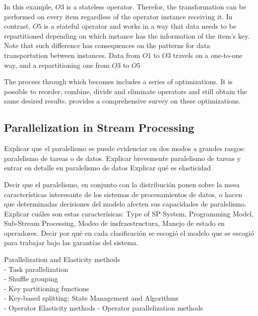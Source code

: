 
  In this example, $O3$ is a stateless operator. Therefor, the transformation can be performed on every item regardless of the operator instance receiving it. In contrast, $O5$ is a stateful operator and works in a way that data needs to be repartitioned depending on which instance has the information of the item's key. Note that such difference has consequences on the patterns for data transportation between instances. Data from $O1$ to $O3$ travels on a one-to-one way, and a repartitioning one from $O3$ to $O5$

  The process through which  becomes  includes a series of optimizations. It is possible to reorder, combine, divide and eliminate operators and still obtain the same desired results. \cite{Hirzel_2014} provides a comprehensive survey on these optimizations.

  \subsection{Parallelization in Stream Processing}

  Explicar que el paralelismo se puede evidenciar en dos modos a grandes
  rasgos: paralelismo de tareas o de datos. Explicar brevemente paralelismo de
  tareas y entrar en detalle en paralelismo de datos
  Explicar qué es elasticidad

  Decir que el paralelismo, en conjunto con la distribución ponen sobre la mesa
  características interesante de los sistemas de procesamientos de datos, o
  hacen que determinadas decisiones del modelo afecten sus capacidades de
  paralelismo. Explicar cuáles son estas caracterísicas: Type of SP System,
  Programming Model, Sub-Stream Processing, Modeo de insfraestructura, Manejo
  de estado en operadores. \cite{R_ger_2019} Decir por qué en cada
  clasificación se escogió el modelo que se escogió para trabajar bajo las
  garantías del sistema.


  Parallelization and Elasticity methods \cite{R_ger_2019}\\
  - Task parallelization \cite{R_ger_2019}\\
  - Shuffle grouping \cite{R_ger_2019}\\
  - Key partitioning functions \cite{R_ger_2019}\\
  - Key-based splitting: State Management and Algorithms \cite{R_ger_2019}\\
  - Operator Elasticity methods \cite{R_ger_2019}
  - Operator parallelization methods \cite{R_ger_2019}

